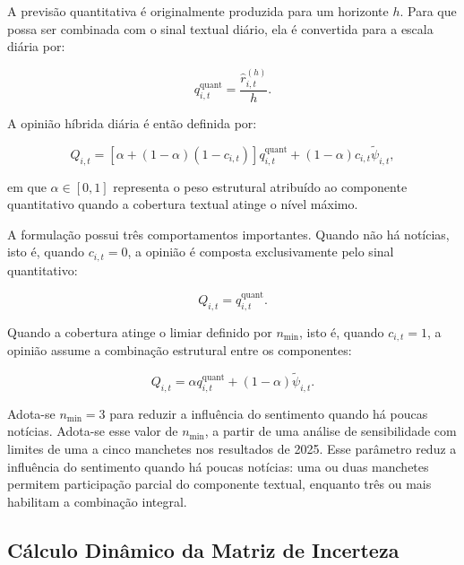 A previsão quantitativa é originalmente produzida para um horizonte $h$. Para que possa ser combinada com o sinal textual diário, ela é convertida para a escala diária por:

\begin{equation}
    q_{i,t}^{\mathrm{quant}}
    =
    \frac{
        \widehat{r}_{i,t}^{(h)}
    }{h}.
    \label{eq:quant_daily}
\end{equation}

A opinião híbrida diária é então definida por:

\begin{equation}
    Q_{i,t}
    =
    \left[
        \alpha
        +
        (1-\alpha)(1-c_{i,t})
    \right]
    q_{i,t}^{\mathrm{quant}}
    +
    (1-\alpha)c_{i,t}
    \widetilde{\psi}_{i,t},
    \label{eq:view_hibrida}
\end{equation}

\noindent em que $\alpha\in[0,1]$ representa o peso estrutural atribuído ao componente quantitativo quando a cobertura textual atinge o nível máximo.

A formulação possui três comportamentos importantes. Quando não há notícias, isto é, quando $c_{i,t}=0$, a opinião é composta exclusivamente pelo sinal quantitativo:

\begin{equation}
    Q_{i,t}
    =
    q_{i,t}^{\mathrm{quant}}.
    \label{eq:view_sem_noticias}
\end{equation}

Quando a cobertura atinge o limiar definido por $n_{\min}$, isto é, quando $c_{i,t}=1$, a opinião assume a combinação estrutural entre os componentes:

\begin{equation}
    Q_{i,t}
    =
    \alpha q_{i,t}^{\mathrm{quant}}
    +
    (1-\alpha)\widetilde{\psi}_{i,t}.
    \label{eq:view_cobertura_maxima}
\end{equation}

Adota-se $n_{\min}=3$ para reduzir a influência do sentimento
quando há poucas notícias. Adota-se esse valor de $n_{\min}$,  a partir de uma análise de sensibilidade com limites de uma a cinco manchetes nos resultados de 2025. Esse parâmetro reduz a influência do sentimento quando há poucas notícias: uma ou duas manchetes permitem participação parcial do componente textual, enquanto três ou mais habilitam a combinação integral.

\subsection{Cálculo Dinâmico da Matriz de Incerteza}
\label{subsec:calculo_omega}

